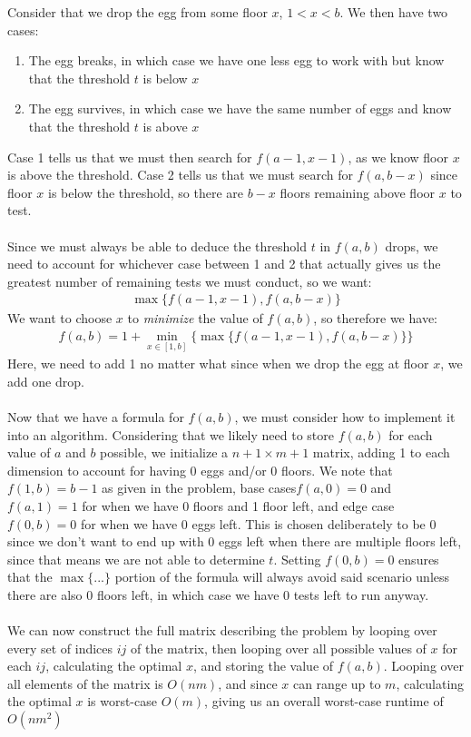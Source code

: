 Consider that we drop the egg from some floor $x$, $1<x<b$. We then have two cases: 
\begin{enumerate}
    \item The egg breaks, in which case we have one less egg to work with but know that the threshold $t$ is below $x$
    \item The egg survives, in which case we have the same number of eggs and know that the threshold $t$ is above $x$
\end{enumerate} 
Case 1 tells us that we must then search for $f(a-1, x-1)$, as we know floor $x$ is above the threshold. Case 2 tells us that we must search for $f(a, b-x)$ since floor $x$ is below the threshold, so there are $b-x$ floors remaining above floor $x$ to test.
\\ \\ Since we must always be able to deduce the threshold $t$ in $f(a, b)$ drops, we need to account for whichever case between 1 and 2 that actually gives us the greatest number of remaining tests we must conduct, so we want: 
\begin{gather*}
    \max\{f(a-1, x-1), f(a, b-x)\}
\end{gather*}
We want to choose $x$ to \textit{minimize} the value of $f(a, b)$, so therefore we have: 
\begin{gather*}
    f(a,b) = 1 + \underset{x \in [1, b]}{\min}\{\max\{f(a-1, x-1), f(a, b-x)\}\}
\end{gather*}
Here, we need to add 1 no matter what since when we drop the egg at floor $x$, we add one drop. 
\\ \\ Now that we have a formula for $f(a, b)$, we must consider how to implement it into an algorithm. Considering that we likely need to store $f(a, b)$ for each value of $a$ and $b$ possible, we initialize a $n+1 \times m+1$ matrix, adding 1 to each dimension to account for having 0 eggs and/or 0 floors. We note that $f(1, b)=b-1$ as given in the problem, base cases$f(a, 0)=0$ and $f(a, 1)=1$ for when we have 0 floors and 1 floor left, and edge case $f(0, b)=0$ for when we have 0 eggs left. This is chosen deliberately to be 0 since we don't want to end up with 0 eggs left when there are multiple floors left, since that means we are not able to determine $t$. Setting $f(0, b)=0$ ensures that the $\max\{...\}$ portion of the formula will always avoid said scenario unless there are also 0 floors left, in which case we have 0 tests left to run anyway.
\\ \\ We can now construct the full matrix describing the problem by looping over every set of indices $ij$ of the matrix, then looping over all possible values of $x$ for each $ij$, calculating the optimal $x$, and storing the value of $f(a,b)$. Looping over all elements of the matrix is $O(nm)$, and since $x$ can range up to $m$, calculating the optimal $x$ is worst-case $O(m)$, giving us an overall worst-case runtime of $O(nm^2)$


